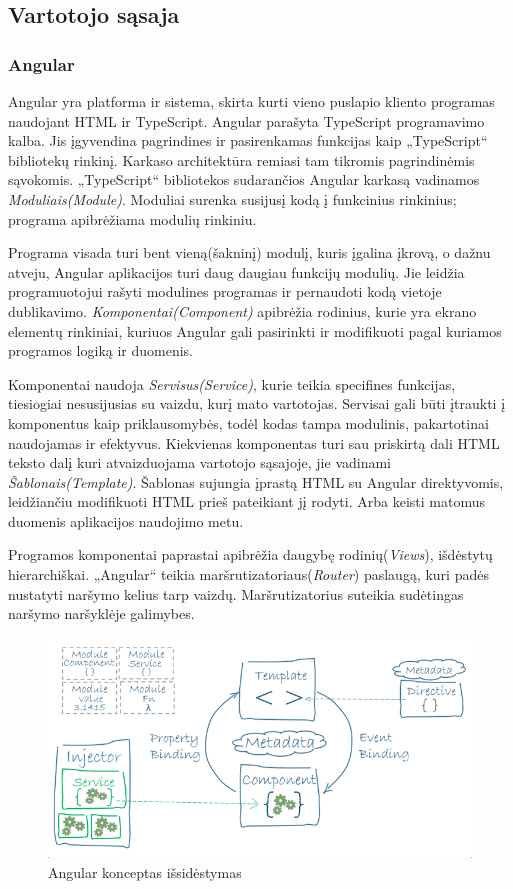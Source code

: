 \documentclass{VUMIFInfBakalaurinis}
\begin{document}
\subsection{Vartotojo sąsaja}
\subsubsection{Angular}

Angular yra platforma ir sistema, skirta kurti vieno puslapio kliento programas naudojant HTML ir TypeScript.
Angular parašyta TypeScript programavimo kalba. Jis įgyvendina pagrindines ir pasirenkamas funkcijas kaip „TypeScript“ bibliotekų rinkinį.
Karkaso architektūra remiasi tam tikromis pagrindinėmis sąvokomis. „TypeScript“ bibliotekos sudarančios Angular karkasą vadinamos \emph{Moduliais(Module)}.
Moduliai surenka susijusį kodą į funkcinius rinkinius; programa apibrėžiama modulių rinkiniu.
 
Programa visada turi bent vieną(šakninį) modulį, kuris įgalina įkrovą, o dažnu atveju, Angular aplikacijos turi daug daugiau funkcijų modulių. Jie leidžia programuotojui rašyti modulines programas ir pernaudoti kodą vietoje dublikavimo.
\emph{Komponentai(Component)} apibrėžia rodinius, kurie yra ekrano elementų rinkiniai, kuriuos Angular gali pasirinkti ir modifikuoti pagal kuriamos programos logiką ir duomenis.

Komponentai naudoja \emph{Servisus(Service)}, kurie teikia specifines funkcijas, tiesiogiai nesusijusias su vaizdu, kurį mato vartotojas. Servisai gali būti įtraukti į komponentus kaip priklausomybės, todėl kodas tampa modulinis, pakartotinai naudojamas ir efektyvus.
Kiekvienas komponentas turi sau priskirtą dali HTML teksto dalį kuri atvaizduojama vartotojo sąsajoje, jie vadinami \emph{Šablonais(Template)}.
Šablonas sujungia įprastą HTML su Angular direktyvomis, leidžiančiu modifikuoti HTML prieš pateikiant jį rodyti. Arba keisti matomus duomenis aplikacijos naudojimo metu.

Programos komponentai paprastai apibrėžia daugybę rodinių(\emph{Views}), išdėstytų hierarchiškai. „Angular“ teikia maršrutizatoriaus(\emph{Router}) paslaugą, kuri padės nustatyti naršymo kelius tarp vaizdų. Maršrutizatorius suteikia sudėtingas naršymo naršyklėje galimybes.

\begin{figure}[H]
    \centering
    \includegraphics[scale=0.5]{img/angular-schema}
    \caption{Angular konceptas išsidėstymas}   %
    \label{img:mlp}
\end{figure}
\end{document}
